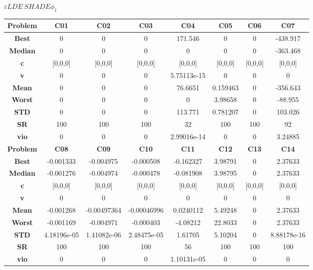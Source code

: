 \documentclass{IEEEtran}
\begin{document}
\begin{center}
$\varepsilon LDE\ SHADE \phi_1$\\
  \begin{tabular}{|c|c|c|c|c|c|c|c|}
    \hline 
    \textbf{Problem} & \textbf{C01} & \textbf{C02} & \textbf{C03} & \textbf{C04} & \textbf{C05} & \textbf{C06} & \textbf{C07} \\ 
    \hline\hline 
    \textbf{Best} & 0 & 0 & 0 & 171.546 & 0 & 0 & -438.917\\ 
    \textbf{Median} & 0 & 0 & 0 & 0 & 0 & 0 & -363.468\\ 
    \textbf{c} & [0,0,0] & [0,0,0] & [0,0,0] & [0,0,0] & [0,0,0] & [0,0,0] & [0,0,0]\\ 
    \textbf{v} & 0 & 0 & 0 & 5.75113e-15 & 0 & 0 & 0\\ 
    \textbf{Mean} & 0 & 0 & 0 & 76.6651 & 0.159463 & 0 & -356.643\\ 
    \textbf{Worst} & 0 & 0 & 0 & 0 & 3.98658 & 0 & -88.955\\ 
    \textbf{STD} & 0 & 0 & 0 & 113.771 & 0.781207 & 0 & 103.026\\ 
    \textbf{SR} & 100 & 100 & 100 & 32 & 100 & 100 & 92\\ 
    \textbf{vio} & 0 & 0 & 0 & 2.99016e-14 & 0 & 0 & 3.24885\\ 
    \hline 
    \hline 
    \textbf{Problem} & \textbf{C08} & \textbf{C09} & \textbf{C10} & \textbf{C11} & \textbf{C12} & \textbf{C13} & \textbf{C14} \\ 
    \hline\hline 
    \textbf{Best} & -0.001333 & -0.004975 & -0.000508 & -0.162327 & 3.98791 & 0 & 2.37633\\ 
    \textbf{Median} & -0.001276 & -0.004974 & -0.000478 & -0.081908 & 3.98795 & 0 & 2.37633\\ 
    \textbf{c} & [0,0,0] & [0,0,0] & [0,0,0] & [0,0,0] & [0,0,0] & [0,0,0] & [0,0,0]\\ 
    \textbf{v} & 0 & 0 & 0 & 0 & 0 & 0 & 0\\ 
    \textbf{Mean} & -0.001268 & -0.00497364 & -0.00046996 & 0.0240112 & 5.49248 & 0 & 2.37633\\ 
    \textbf{Worst} & -0.001169 & -0.004971 & -0.000403 & -4.08212 & 22.8033 & 0 & 2.37633\\ 
    \textbf{STD} & 4.18196e-05 & 1.41082e-06 & 2.48475e-05 & 1.61705 & 5.10204 & 0 & 8.88178e-16\\ 
    \textbf{SR} & 100 & 100 & 100 & 56 & 100 & 100 & 100\\ 
    \textbf{vio} & 0 & 0 & 0 & 1.10131e-05 & 0 & 0 & 0\\ 

\end{tabular}
\end{center}
\end{document}
